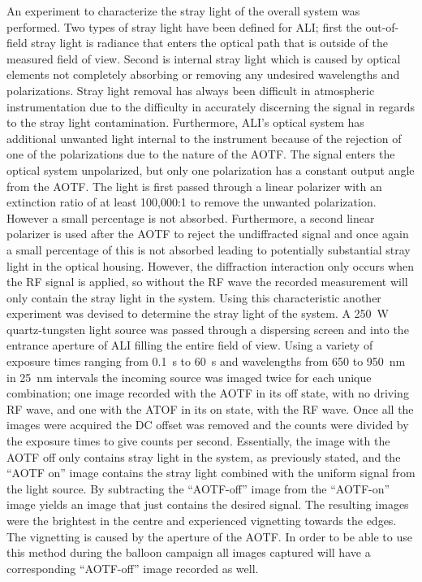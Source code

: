 \documentclass[12pt]{article}
\begin{document}
An experiment to characterize the stray light of the overall system was performed. Two types of stray light have been defined for ALI; first the out-of-field stray light is 
radiance that enters the optical path that is outside of the measured field of view. Second is internal stray light which is caused by optical elements not completely absorbing 
or removing any undesired wavelengths and polarizations. Stray light removal has always been difficult in atmospheric instrumentation due to the difficulty in accurately 
discerning the signal in regards to the stray light contamination. Furthermore, ALI's optical system has additional unwanted light internal to the instrument because of the 
rejection of one of the polarizations due to the nature of the AOTF. The signal enters the optical system unpolarized, but only one polarization has a constant output angle from 
the AOTF. The light is first passed through a linear polarizer with an extinction ratio of at least 100,000:1 to remove the unwanted polarization. However a small percentage is 
not absorbed. Furthermore, a second linear polarizer is used after the AOTF to reject the undiffracted signal and once again a small percentage of this is not absorbed leading 
to potentially substantial stray light in the optical housing. However, the diffraction interaction only occurs when the RF signal is applied, so without the RF wave the 
recorded measurement will only contain the stray light in the system. Using this characteristic another experiment was devised to determine the stray light of the system. A 
250~W quartz-tungsten light source was passed through a dispersing screen and into the entrance aperture of ALI filling the entire field of view. Using a variety of exposure 
times ranging from 0.1~s to 60~s and wavelengths from 650 to 950~nm in 25~nm intervals the incoming source was imaged twice for each unique combination; one image recorded with 
the AOTF in its off state, with no driving RF wave, and one with the ATOF in its on state, with the RF wave. Once all the images were acquired the DC offset was removed and the 
counts were divided by the exposure times to give counts per second. Essentially, the image with the AOTF off only contains stray light in the system, as previously stated, and 
the ``AOTF on'' image contains the stray light combined with the uniform signal from the light source. By subtracting the ``AOTF-off'' image from the ``AOTF-on'' image yields an 
image that just contains the desired signal. The resulting images were the brightest in the centre and experienced vignetting towards the edges. The vignetting is caused by the 
aperture of the AOTF. In order to be able to use this method during the balloon campaign all images captured  will have a corresponding ``AOTF-off'' image recorded as well.
\end{document}
